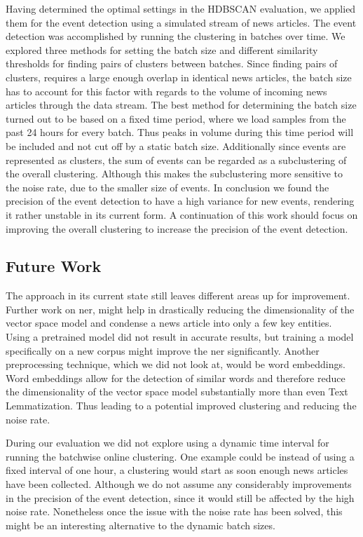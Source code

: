 Having determined the optimal settings in the HDBSCAN evaluation,
we applied them for the event detection using a simulated stream of news articles.
The event detection was accomplished by running the clustering in batches over time.
We explored three methods for setting the batch size and different similarity thresholds for finding pairs of clusters between batches.
Since finding pairs of clusters, requires a large enough overlap in identical news articles,
the batch size has to account for this factor with regards to the volume of incoming news articles
through the data stream. 
The best method for determining the batch size turned out to be based on a fixed time period,
where we load samples from the past 24 hours for every batch. 
Thus peaks in volume during this time period will be included and not cut off by a static batch size.  
Additionally since events are represented as clusters,
the sum of events can be regarded as a subclustering of the overall clustering.
Although this makes the subclustering more sensitive to the noise rate, due to the smaller size of events.
In conclusion we found the precision of the event detection to have a high variance for new events, 
rendering it rather unstable in its current form.
A continuation of this work should focus on improving the overall clustering to increase the precision of the event detection.

\subsection{Future Work}
\label{subsec:6_future_work}

The approach in its current state still leaves different areas up for improvement.
Further work on \Gls{ner}, might help in drastically reducing the dimensionality of the vector space model
and condense a news article into only a few key entities.
Using a pretrained model did not result in accurate results,
but training a model specifically on a new corpus might improve the \Gls{ner} significantly.
Another preprocessing technique, which we did not look at, would be word embeddings.
Word embeddings allow for the detection of similar words and therefore reduce the dimensionality
of the vector space model substantially more than even Text Lemmatization.
Thus leading to a potential improved clustering and reducing the noise rate.

During our evaluation we did not explore using a dynamic time interval for running the batchwise online clustering. 
One example could be instead of using a fixed interval of one hour, a clustering would start as soon enough news articles have been collected.
Although we do not assume any considerably improvements in the precision of the event detection, 
since it would still be affected by the high noise rate. Nonetheless once the issue with the noise rate has been solved, 
this might be an interesting alternative to the dynamic batch sizes.

